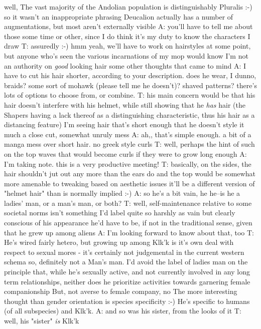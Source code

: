 well, The vast majority of the Andolian population is distinguishably Pluralis :-)
so it wasn't an inappropriate phrasing
Deucalion actually has a number of augmentations, but most aren't externally visible
A: you'll have to tell me about those some time or other, since I do think it's my duty to know the characters I draw
T: assuredly :-)
hmm yeah, we'll have to work on hairstyles at some point, but anyone who's seen the various incarnations of my mop would know I'm not an authority on {\em good} looking hair
some other thoughts that came to mind
A: I have to cut his hair shorter, according to your description. does he wear, I dunno, braids? some sort of mohawk (please tell me he doesn't)? shaved patterns? there's lots of options to choose from, or combine.
T: his main concern would be that his hair doesn't interfere with his helmet, while still showing that he {\em has} hair
(the Shapers having a lack thereof as a distinguishing characteristic, thus his hair as a distancing feature)
I'm seeing hair that's short enough that he doesn't style it much
a close cut, somewhat unruly mess
A: ah,, that's simple enough. a bit of a manga mess over short hair.
no greek style curls
T: well, perhaps the hint of such on the top
waves that would become curls if they were to grow long enough
A: I'm taking note.
this is a very productive meeting!
T: basically, on the sides, the hair shouldn't jut out any more than the ears do
and the top would be somewhat more amenable to tweaking based on aesthetic issues
it'll be a different version of "helmet hair" than is normally implied :-)
A: so he's a bit vain, he he--is he a ladies' man, or a man's man, or both?
T: well, self-maintenance relative to some societal norms isn't something I'd label quite so harshly as vain
but clearly conscious of his appearance
he'd have to be, if not in the traditional sense, given that he grew up among aliens
A: I'm looking forward to know about that, too
T: He's wired fairly hetero, but growing up among Klk'k is it's own deal with respect to sexual mores - it's certainly not judgemental in the current western schema
so, definitely not a Man's man. I'd avoid the label of ladies man on the principle that, while he's sexually active, and not currently involved in any long term relationships, neither does he prioritize activities towards garnering female companionship
But, not averse to female company, no
The more interesting thought than gender orientation is species specificity :-)
He's specific to humans (of all subspecies) and Klk'k.
A: and so was his sister, from the looks of it
T: well, his "sister" {\em is} Klk'k

